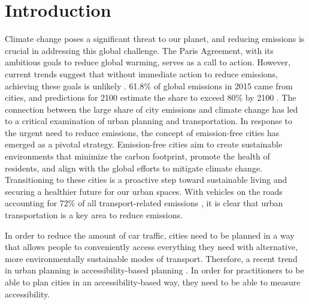 \clearpage
\section{Introduction}
\label{sec:introduction}




Climate change poses a significant threat to our planet, and reducing emissions is crucial in addressing this global challenge.
The Paris Agreement, with its ambitious goals to reduce global warming, serves as a call to action.
However, current trends suggest that without immediate action to reduce emissions, achieving these goals is unlikely \cite{krieglerPathwaysLimitingWarming2018, liuCountrybasedRateEmissions2021}.
61.8\% of global emissions in 2015 came from cities, and predictions for 2100 estimate the share to exceed 80\% by 2100 \cite{gurneyGreenhouseGasEmissions2021}.
The connection between the large share of city emissions and climate change has led to a critical examination of urban planning and transportation.
In response to the urgent need to reduce emissions, the concept of emission-free cities has emerged as a pivotal strategy.
Emission-free cities aim to create sustainable environments that minimize the carbon footprint, promote the health of residents, and align with the global efforts to mitigate climate change.
Transitioning to these cities is a proactive step toward sustainable living and securing a healthier future for our urban spaces.
With vehicles on the roads accounting for 72\% of all transport-related emissions \cite{Sims2014Transport}, it is clear that urban transportation is a key area to reduce emissions.


In order to reduce the amount of car traffic, cities need to be planned in a way that allows people to conveniently access everything they need with alternative, more environmentally sustainable modes of transport.
Therefore, a recent trend in urban planning is accessibility-based planning \cite{proffittAccessibilityPlanningAmerican2019} \cite{geursAccessibilityEvaluationLanduse2004a}.
In order for practitioners to be able to plan cities in an accessibility-based way, they need to be able to measure accessibility.

